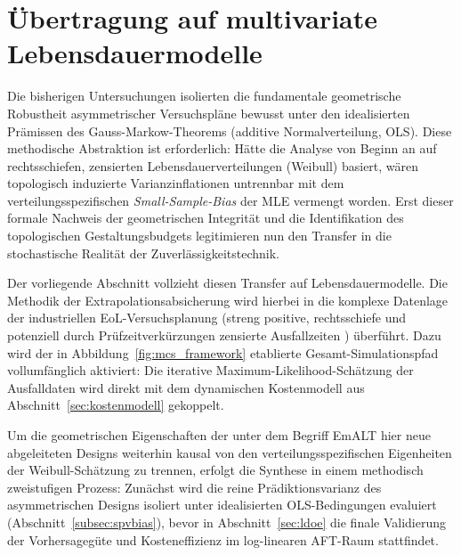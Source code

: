 \section{Übertragung auf multivariate Lebensdauermodelle} \label{sec:weibull_transfer}

Die bisherigen Untersuchungen isolierten die fundamentale geometrische Robustheit asymmetrischer Versuchspläne bewusst unter den idealisierten Prämissen des Gauss-Markow-Theorems (additive Normalverteilung, \ac{OLS}).
Diese methodische Abstraktion ist erforderlich: Hätte die Analyse von Beginn an auf rechtsschiefen, zensierten Lebensdauerverteilungen (Weibull) basiert, wären topologisch induzierte Varianzinflationen untrennbar mit dem verteilungsspezifischen \textit{Small-Sample-Bias} der \ac{MLE} vermengt worden.
Erst dieser formale Nachweis der geometrischen Integrität und die Identifikation des topologischen Gestaltungsbudgets legitimieren nun den Transfer in die stochastische Realität der Zuverlässigkeitstechnik.

Der vorliegende Abschnitt vollzieht diesen Transfer auf Lebensdauermodelle.
Die Methodik der Extrapolationsabsicherung wird hierbei in die komplexe Datenlage der industriellen \ac{EoL}-Versuchsplanung (streng positive, rechtsschiefe und potenziell durch Prüfzeitverkürzungen zensierte Ausfallzeiten \cite{Meeker.2022}) überführt.
Dazu wird der in Abbildung~\ref{fig:mcs_framework} etablierte Gesamt-Simulationspfad vollumfänglich aktiviert: Die iterative Maximum-Likelihood-Schätzung der Ausfalldaten wird direkt mit dem dynamischen Kostenmodell aus Abschnitt~\ref{sec:kostenmodell} gekoppelt.

Um die geometrischen Eigenschaften der unter dem Begriff \ac{EmALT} hier neue abgeleiteten Designs weiterhin kausal von den verteilungsspezifischen Eigenheiten der Weibull-Schätzung zu trennen, erfolgt die Synthese in einem methodisch zweistufigen Prozess:
Zunächst wird die reine Prädiktionsvarianz des asymmetrischen Designs isoliert unter idealisierten \ac{OLS}-Bedingungen evaluiert (Abschnitt~\ref{subsec:spvbias}), bevor in Abschnitt~\ref{sec:ldoe} die finale Validierung der Vorhersagegüte und Kosteneffizienz im log-linearen \ac{AFT}-Raum stattfindet.

